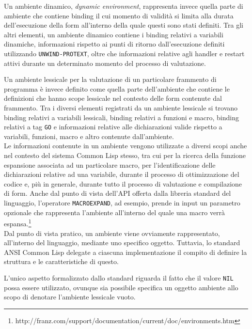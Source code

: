 Un ambiente dinamico, \textit{dynamic environment}, rappresenta invece quella
parte di ambiente che contiene binding il cui momento di validità si limita alla
durata dell'esecuzione della form all'interno della quale questi sono stati
definiti. Tra gli altri elementi, un ambiente dinamico contiene i binding
relativi a variabili dinamiche, informazioni rispetto ai punti di ritorno
dall'esecuzione definiti utilizzando \texttt{UNWIND-PROTEXT}, oltre che
informazioni relative agli handler e restart attivi durante un determinato
momento del processo di valutazione.

Un ambiente lessicale per la valutazione di un particolare frammento di
programma è invece definito come quella parte dell'ambiente che contiene le
definizioni che hanno scope lessicale nel contesto delle form contenute dal
frammento. Tra i diversi elementi registrati da un ambiente lessicale si trovano
binding relativi a variabili lessicali, binding relativi a funzioni e macro,
binding relativi a tag \texttt{GO} e informazioni relative alle dichiarazioni
valide rispetto a variabili, funzioni, macro e altro contenute dall'ambiente.\\

Le informazioni contenute in un ambiente vengono utilizzate a diversi
scopi anche nel contesto del sistema Common Lisp stesso, tra cui per la ricerca
della funzione espansione associata ad un particolare macro, per
l'identificazione delle dichiarazioni relative ad una variabile, durante il
processo di ottimizzazione del codice e, più in generale, durante tutto il
processo di valutazione e compilazione di form. Anche dal punto di vista
dell'API offerta dalla libreria standard del linguaggio, l’operatore
\texttt{MACROEXPAND}, ad esempio, prende in input un parametro opzionale che
rappresenta l’ambiente all’interno del quale una macro verrà
espansa.\footnote{http://franz.com/support/documentation/current/doc/environments.htm}\\

Dal punto di vista pratico, un ambiente viene ovviamente rappresentato,
all'interno del linguaggio, mediante uno specifico oggetto. Tuttavia, lo
standard ANSI Common Lisp delegate a ciascuna implementazione il compito di
definire la struttura e le caratteristiche di questo.

L'unico aspetto formalizzato dallo standard riguarda il fatto che il valore
\texttt{NIL} possa essere utilizzato, ovunque sia possibile specifica un oggetto
ambiente allo scopo di denotare l'ambiente lessicale vuoto.\\

